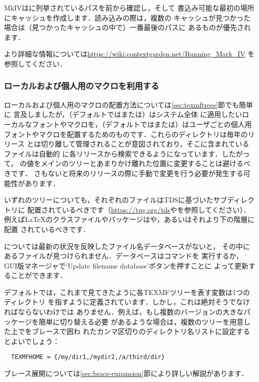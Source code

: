 \documentclass[uplatex,dvipdfmx,tombow]{jsarticle}
\begin{document}
{\ConTeXt} MkIVはに列挙されているパスを前から確認し，そして
書込み可能な最初の場所にキャッシュを作成します．読み込みの際は，複数の
キャッシュが見つかった場合は（見つかったキャッシュの中で）一番最後のパスに
あるものが優先されます．

より詳細な情報については\url{https://wiki.contextgarden.net/Running_Mark_IV}%
を参照してください．

\subsubsection{ローカルおよび個人用のマクロを利用する}
\label{sec:local-personal-macros}

ローカルおよび個人用のマクロの配置方法については\ref{sec:texmftrees}節でも簡単に
言及しましたが，（デフォルトではまたは）はシステム全体
に適用したいローカルなフォントやマクロを，（デフォルトではまたは）はユーザごとの個人用
フォントやマクロを配置するためのものです．これらのディレクトリは毎年のリリース
とは切り離して管理されることが意図されており，そこに含まれているファイルは自動的
に各\TL リリースから検索できるようになっています．したがって，%
の値をメインの\TL ツリーとあまりかけ離れた位置に変更することは避けるべきです．
さもないと将来のリリースの際に手動で変更を行う必要が発生する可能性があります．

いずれのツリーについても，それぞれのファイルはTDSに基づいたサブディレクトリに
配置されているべきです（\url{https://tug.org/tds}やを参照してください）．例えば\LaTeX のクラスファイルやパッケージはや，あるいはそれより下の階層に配置
されているべきです．

については最新の状況を反映したファイル名データベースがないと，
その中にあるファイルが見つけられません．データベースはコマンドを
実行するか，GUI版\TL マネージャで`Update filename database'ボタンを押すことに
よって更新することができます．

デフォルトでは，これまで見てきたように各TEXMFツリーを表す変数は1つのディレクトリ
を指すように定義されています．しかし，これは絶対そうでなければならないわけでは
ありません．例えば，もし複数のバージョンの大きなパッケージを簡単に切り替える必要
があるような場合は，複数のツリーを用意した上でをブレースで囲わ
れたカンマ区切りのディレクトリ名リストに設定するとよいでしょう：
%
\begin{verbatim}
  TEXMFHOME = {/my/dir1,/mydir2,/a/third/dir}
\end{verbatim}
%
ブレース展開については\ref{sec:brace-expansion}節により詳しい解説があります．
\end{document}
